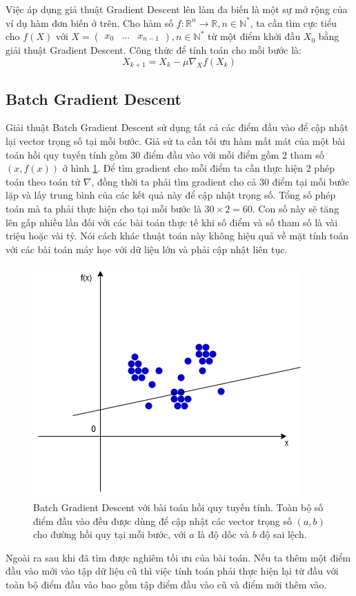 Việc áp dụng giả thuật Gradient Descent lên làm đa biến là một sự mở rộng của ví dụ hàm đơn biến ở trên. Cho hàm số $f:{{\mathbb{R}}^n}{\rightarrow}{\mathbb{R}}, n{\in}{\mathbb{N}}^*$, ta cần tìm cực tiểu cho $f(X)$ với $X=\begin{pmatrix}x_0 & ... & x_{n-1}\end{pmatrix}, n{\in}{\mathbb{N}}^*$ từ một điểm khởi đầu $X_0$ bằng giải thuật Gradient Descent. Công thức để tính toán cho mỗi bước là:
\begin{equation}
	X_{k+1}=X_{k}-{\mu}{{\nabla}_X}f\left(X_{k}\right)
\end{equation}
\subsection{Batch Gradient Descent}
Giải thuật Batch Gradient Descent sử dụng tất cả các điểm đầu vào để cập nhật lại vector trọng số tại mỗi bước. Giả sử ta cần tối ưu hàm mất mát của một bài toán hồi quy tuyến tính gồm 30 điểm đầu vào với mỗi điểm gồm 2 tham số $\left(x,f\left(x\right)\right)$ ở hình \ref{fig:batch_gradient_descent}. Để tìm gradient cho mỗi điểm ta cần thực hiện 2 phép toán theo toán tử $\nabla$, đồng thời ta phải tìm gradient cho cả 30 điểm tại mỗi bước lặp và lấy trung bình của các kết quả này để cập nhật trọng số. Tổng số phép toán mà ta phải thực hiện cho tại mỗi bước là $30\times2=60$. Con số này sẽ tăng lên gấp nhiều lần đối với các bài toán thực tế khi số điểm và số tham số là vài triệu hoặc vài tỷ. Nói cách khác thuật toán này không hiệu quả về mặt tính toán với các bài toán máy học với dữ liệu lớn và phải cập nhật liên tục.
\begin{figure}[ht!]
	\centerline{\includegraphics[scale=0.6]{images/batch_gradient_descent.png}}
  	\caption{Batch Gradient Descent với bài toán hồi quy tuyến tính. Toàn bộ số điểm đầu vào đều được dùng để cập nhật các vector trọng số $(a,b)$ cho đường hồi quy tại mỗi bước, với $a$ là độ dốc và $b$ độ sai lệch.}
  	\label{fig:batch_gradient_descent}
\end{figure} 
Ngoài ra sau khi đã tìm được nghiêm tối ưu của bài toán. Nếu ta thêm một điểm đầu vào mới vào tập dữ liệu cũ thì việc tính toán phải thực hiện lại từ đầu với toàn bộ điểm đầu vào bao gồm tập điểm đầu vào cũ và điểm mới thêm vào.
